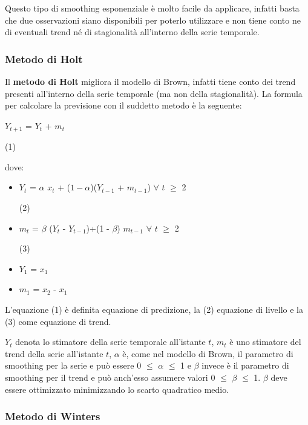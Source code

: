 \documentclass[12pt,a4paper,twoside,openright]{book}
\begin{document}
Questo tipo di smoothing esponenziale è molto facile da applicare, infatti basta che due osservazioni siano disponibili per poterlo utilizzare e non tiene conto ne di eventuali trend né di stagionalità all'interno della serie temporale.
\subsubsection{Metodo di Holt}
Il {\bfseries metodo di Holt} migliora il modello di Brown, infatti tiene conto dei trend presenti all'interno della serie temporale (ma non della stagionalità). La formula per calcolare la previsione con il suddetto metodo è la seguente:

 \begin{center} 
$Y_{t+1}$ = $Y_{t}$ + $m_{t}$  
\end{center} 
\begin{flushright}
(1)
\end{flushright}

dove: 
\begin{itemize}

\item $Y_{t}$ = $\alpha$ $x_{t}$ + (${1 - \alpha }$)($Y_{t-1}$ + $m_{t-1}$) $\forall$ $t$ $\geq$ 2 
\begin{flushright}
(2)
\end{flushright}
\item $m_{t}$ = $\beta$ ($Y_{t}$ - $Y_{t-1}$)+(1 - $\beta$) $m_{t-1}$ $\forall$ $t$ $\geq$ 2 
\begin{flushright}
(3)
\end{flushright}
\item $Y_{1}$ = $x_{1}$

\item $m_{1}$ = $x_{2}$ - $x_{1}$
\end{itemize}


L'equazione (1) è definita equazione di predizione, la (2) equazione di livello e la (3) come equazione di trend. 

$Y_{t}$ denota lo stimatore della serie temporale all'istante $t$, $m_{t}$ è uno stimatore del trend della serie all'istante $t$, $\alpha$ è, come nel modello di Brown, il parametro di smoothing per la serie e può essere 0 $\leq$ $\alpha$ $\leq$ 1 e $\beta$ invece è il parametro di smoothing per il trend e può anch'esso assumere valori 0 $\leq$ $\beta$ $\leq$ 1. 
$\beta$ deve essere ottimizzato minimizzando lo scarto quadratico medio.

\subsubsection{Metodo di Winters}
\end{document}
